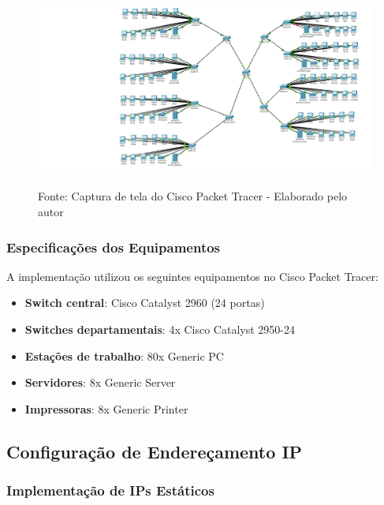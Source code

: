 \begin{figure}[H]
\centering
{}
\includegraphics[width=1\textwidth]{figure/rede-estrela.png}

\label{fig:topologia_supertech}
{\fontsize{10pt}{\baselineskip}\selectfont
Fonte: Captura de tela do Cisco Packet Tracer - Elaborado pelo autor}
\end{figure}

\subsubsection{Especificações dos Equipamentos}

A implementação utilizou os seguintes equipamentos no Cisco Packet Tracer:

\begin{itemize}
    \item \textbf{Switch central}: Cisco Catalyst 2960 (24 portas)
    \item \textbf{Switches departamentais}: 4x Cisco Catalyst 2950-24
    \item \textbf{Estações de trabalho}: 80x Generic PC
    \item \textbf{Servidores}: 8x Generic Server
    \item \textbf{Impressoras}: 8x Generic Printer
\end{itemize}

\subsection{Configuração de Endereçamento IP}

\subsubsection{Implementação de IPs Estáticos}

